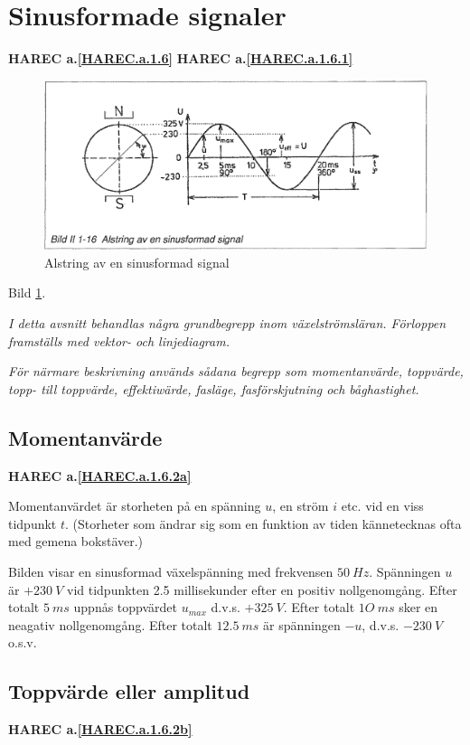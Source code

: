 \section{Sinusformade signaler}
\textbf{HAREC a.\ref{HAREC.a.1.6}\label{myHAREC.a.1.6}}
\textbf{HAREC a.\ref{HAREC.a.1.6.1}\label{myHAREC.a.1.6.1}}

\begin{figure}[h]
\includegraphics[width=\textwidth]{images/bild_2_1-16}
\caption{Alstring av en sinusformad signal}
\label{fig:BildII1-16}
\end{figure}

Bild \ref{fig:BildII1-16}.

\emph{I detta avsnitt behandlas några grundbegrepp inom växelströmsläran.
Förloppen framställs med vektor- och linjediagram.}

\emph{För närmare beskrivning används sådana begrepp som momentanvärde,
toppvärde, topp- till toppvärde, effektiwärde, fasläge, fasförskjutning och
båghastighet.}

\subsection{Momentanvärde}
\textbf{HAREC a.\ref{HAREC.a.1.6.2a}\label{myHAREC.a.1.6.2a}}

Momentanvärdet är storheten på en spänning \(u\), en ström \(i\) etc. vid en
viss tidpunkt \(t\). (Storheter som ändrar sig som en funktion av tiden
kännetecknas ofta med gemena bokstäver.)

Bilden visar en sinusformad växelspänning med frekvensen \(50\ Hz\). Spänningen
\(u\) är \(+230\ V\) vid tidpunkten 2.5 millisekunder efter en positiv
nollgenomgång. Efter totalt \(5\ ms\) uppnås toppvärdet \(u_{max}\) d.v.s.
\(+325\ V\). Efter totalt \(1O\ ms\) sker en neagativ nollgenomgång. Efter
totalt \(12.5\ ms\) är spänningen \(-u\), d.v.s. \(-230\ V\) o.s.v.

\subsection{Toppvärde eller amplitud}
\textbf{HAREC a.\ref{HAREC.a.1.6.2b}\label{myHAREC.a.1.6.2b}}

